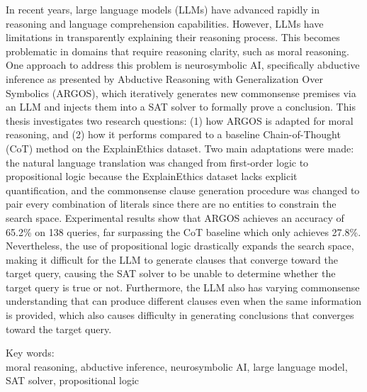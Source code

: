 \noindent In recent years, large language models (LLMs) have advanced rapidly in reasoning and language comprehension capabilities. However, LLMs have limitations in transparently explaining their reasoning process. This becomes problematic in domains that require reasoning clarity, such as moral reasoning. One approach to address this problem is neurosymbolic AI, specifically abductive inference as presented by Abductive Reasoning with Generalization Over Symbolics (ARGOS), which iteratively generates new commonsense premises via an LLM and injects them into a SAT solver to formally prove a conclusion. This thesis investigates two research questions: (1) how ARGOS is adapted for moral reasoning, and (2) how it performs compared to a baseline Chain-of-Thought (CoT) method on the ExplainEthics dataset. Two main adaptations were made: the natural language translation was changed from first-order logic to propositional logic because the ExplainEthics dataset lacks explicit quantification, and the commonsense clause generation procedure was changed to pair every combination of literals since there are no entities to constrain the search space. Experimental results show that ARGOS achieves an accuracy of 65.2\% on 138 queries, far surpassing the CoT baseline which only achieves 27.8\%. Nevertheless, the use of propositional logic drastically expands the search space, making it difficult for the LLM to generate clauses that converge toward the target query, causing the SAT solver to be unable to determine whether the target query is true or not. Furthermore, the LLM also has varying commonsense understanding that can produce different clauses even when the same information is provided, which also causes difficulty in generating conclusions that converges toward the target query.

\vspace*{0.2cm}

\noindent Key words: \\ moral reasoning, abductive inference, neurosymbolic AI, large language model, SAT solver, propositional logic \\

\newpage
